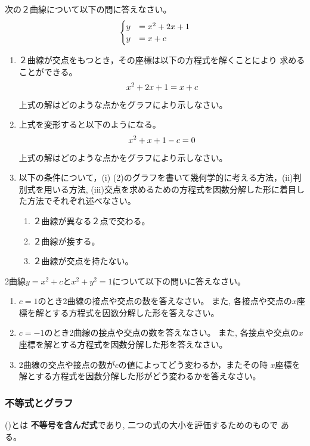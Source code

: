 \documentclass[twocolumn,11pt]{jarticle}
\begin{document}
\nquestion
次の２曲線について以下の問に答えなさい。
\begin{align}
  \begin{cases}
    y&=x^2+2x+1\notag\\
    y&=x+c\notag
  \end{cases}
\end{align}
\begin{enumerate}
\item ２曲線が交点をもつとき，その座標は以下の方程式を解くことにより
  求めることができる。
  \begin{align}
    x^2+2x+1=x+c\notag
  \end{align}
  上式の解はどのような点かをグラフにより示しなさい。
\item 上式を変形すると以下のようになる。
  \begin{align}
    x^2+x+1-c=0\notag
  \end{align}
  上式の解はどのような点かをグラフにより示しなさい。
\item 以下の条件について，(i) (2)のグラフを書いて幾何学的に考える方法，(ii)判別式を用いる方法, (iii)交点を求めるための方程式を因数分解した形に着目した方法でそれぞれ述べなさい。
  \begin{enumerate}
  \item ２曲線が異なる２点で交わる。
  \item ２曲線が接する。
  \item ２曲線が交点を持たない。
  \end{enumerate}
\end{enumerate}

\nquestion
2曲線$y=x^2+c$と$x^2+y^2=1$について以下の問いに答えなさい。
\begin{enumerate}
\item $c=1$のとき2曲線の接点や交点の数を答えなさい。
また, 各接点や交点の$x$座標を解とする方程式を因数分解した形を答えなさい。
\item $c=-1$のとき2曲線の接点や交点の数を答えなさい。
また, 各接点や交点の$x$座標を解とする方程式を因数分解した形を答えなさい。
\item 2曲線の交点や接点の数が$c$の値によってどう変わるか，またその時
  $x$座標を解とする方程式を因数分解した形がどう変わるかを答えなさい。
\end{enumerate}

\subsubsection{不等式とグラフ}
()とは
\textbf{不等号を含んだ式}であり, 二つの式の大小を評価するためのもので
ある。
\end{document}
